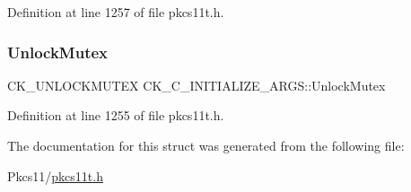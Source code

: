 Definition at line 1257 of file pkcs11t.\+h.

\mbox{\label{struct_c_k___c___i_n_i_t_i_a_l_i_z_e___a_r_g_s_a39405e53ae004b728c1f17d462c1bea5}} 
\subsubsection{\texorpdfstring{Unlock\+Mutex}{UnlockMutex}}
{\footnotesize\ttfamily C\+K\+\_\+\+U\+N\+L\+O\+C\+K\+M\+U\+T\+EX C\+K\+\_\+\+C\+\_\+\+I\+N\+I\+T\+I\+A\+L\+I\+Z\+E\+\_\+\+A\+R\+G\+S\+::\+Unlock\+Mutex}



Definition at line 1255 of file pkcs11t.\+h.



The documentation for this struct was generated from the following file\+:\begin{DoxyCompactItemize}
\item 
Pkcs11/\hyperlink{pkcs11t_8h}{pkcs11t.\+h}\end{DoxyCompactItemize}
